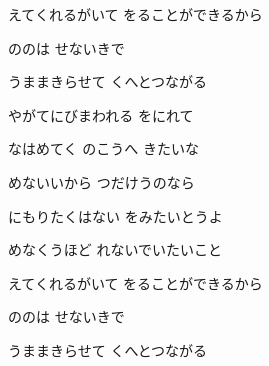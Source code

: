 \documentclass[14pt]{extreport}
\begin{document}
{  えてくれるがいて をることができるから
  \jisho{}

\item
  ののは せないきで
  \jisho{}

  うままきらせて くへとつながる
  \jisho{}

\item
  やがてにびまわれる をにれて
  \jisho{}

  なはめてく のこうへ きたいな
  \jisho{}

\item
  めないいから つだけうのなら
  \jisho{}

  にもりたくはない をみたいとうよ
  \jisho{}

\item
  めなくうほど れないでいたいこと
  \jisho{}

  えてくれるがいて をることができるから
  \jisho{}

\item
  ののは せないきで
  \jisho{}

  うままきらせて くへとつながる
  \jisho{}


}
\end{document}
